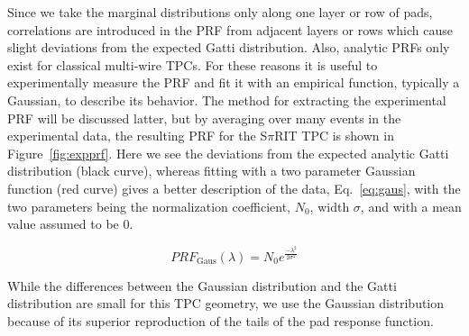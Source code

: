 Since we take the marginal distributions only along one layer or row of pads, correlations are introduced in the PRF from adjacent layers or rows which cause slight deviations from the expected Gatti distribution. Also, analytic PRFs only exist for classical multi-wire TPCs. For these reasons it is useful to experimentally measure the PRF and fit it with an empirical function, typically a Gaussian, to describe its behavior. The method for extracting the experimental PRF will be discussed latter, but by averaging over many events in the experimental data, the resulting PRF for the S$\pi$RIT TPC is shown in Figure~\ref{fig:expprf}. Here we see the deviations from the expected analytic Gatti distribution (black curve), whereas fitting with a two parameter Gaussian function (red curve) gives a better description of the  data, Eq.~\ref{eq:gaus}, with the two parameters being the normalization coefficient, $N_0$, width $\sigma$, and with a mean value assumed to be 0.

\begin{equation}\label{eq:prfgaus}
PRF_{\mathrm{Gaus}}(\lambda) = N_0 e^\frac{-\lambda^2}{2\sigma^2}
\end{equation}

While the differences between the Gaussian distribution and the Gatti distribution are small for this TPC geometry, we use the Gaussian distribution because of its superior reproduction of the tails of the pad response function.   



\begin{comment}
\subsection{Considerations when constructing a TPC}
Several considerations went into the construction of the S$\pi$RI TPC which I wish to summarize and document here. All materials and glues of the TPC were selected as low out-gassing materials. Several materials (that are common place in nuclear labs), such as vacuum grease, Viton o-rings, all out-gas organic chemicals into the counter gas which damage the TPC by permanently lowering the gain over time. The organic molecules responsible are difficult to identify exactly, but lists of good and bad materials are well known in the literature from experiments. If a material we wished to used was not on these lists we placed the material in a clean chamber with the counter gas and flowed this counter gas through a small proportional counter making sure the gain did not drop at high collection rates when exposed to a high rate alpha Americium source. 

Sparking
Two volumes of gas. 
\end{comment}


